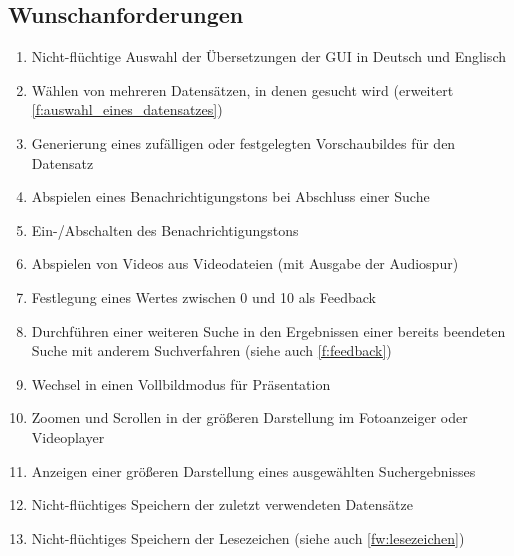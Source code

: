 \subsection{Wunschanforderungen}
\begin{enumerate} [label=\bfseries /FW \arabic*0/, leftmargin=*]
	\item Nicht-flüchtige Auswahl der Übersetzungen der \gls{GUI} in Deutsch und Englisch \label{fw:sprache}
	\newline
	\item Wählen von mehreren Datensätzen, in denen gesucht wird (erweitert \ref{f:auswahl_eines_datensatzes}) \label{fw:mehrere_datensaetze_waehlen}
	\item Generierung eines zufälligen oder festgelegten Vorschaubildes für den Datensatz \label{fw:vorschaubild}
	\newline
	\item Abspielen eines Benachrichtigungstons bei Abschluss einer Suche \label{fw:signalton}
	\item Ein-/Abschalten des Benachrichtigungstons \label{fw:signalton_einaus}
	\item Abspielen von Videos aus Videodateien (mit Ausgabe der Audiospur) \label{fw:echtes_video_abspielen}
	\newline
	\item Festlegung eines Wertes zwischen 0 und 10 als Feedback \label{fw:zehner_feedback}
	\item Durchführen einer weiteren Suche in den Ergebnissen einer bereits beendeten Suche mit anderem Suchverfahren (siehe auch \ref{f:feedback}) \label{fw:weitere_suche}
	\newline
	\item Wechsel in einen Vollbildmodus für Präsentation \label{fw:präsentation}
	\item Zoomen und Scrollen in der größeren Darstellung im Fotoanzeiger oder Videoplayer \label{fw:zoom_scroll}
	\item Anzeigen einer größeren Darstellung eines ausgewählten Suchergebnisses \label{fw:groesseres_suchergebnis}
	\newline
	\item Nicht-flüchtiges Speichern der zuletzt verwendeten Datensätze \label{fw:speichern_historie}
	\item Nicht-flüchtiges Speichern der Lesezeichen (siehe auch \ref{fw:lesezeichen}) \label{fw:speichern_lesezeichen}

\end{enumerate}
